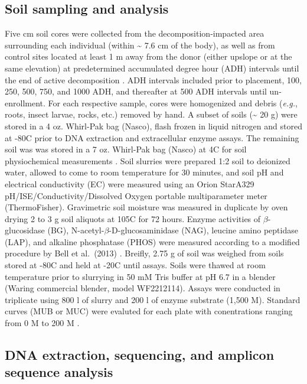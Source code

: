 \documentclass[
  10pt,
  letterpaper,
]{article}
\begin{document}
\subsection{Soil sampling and
analysis}\label{soil-sampling-and-analysis}

Five cm soil cores were collected from the decomposition-impacted area
surrounding each individual (within \textasciitilde{} 7.6 cm of the
body), as well as from control sites located at least 1 m away from the
donor (either upslope or at the same elevation) at predetermined
accumulated degree hour (ADH) intervals until the end of active
decomposition \citep{mason_body_2022}. ADH intervals included prior to
placement, 100, 250, 500, 750, and 1000 ADH, and thereafter at 500 ADH
intervals until un-enrollment. For each respective sample, cores were
homogenized and debris (\emph{e.g.}, roots, insect larvae, rocks, etc.)
removed by hand. A subset of soils (\textasciitilde{} 20 g) were stored
in a 4 oz. Whirl-Pak bag (Nasco), flash frozen in liquid nitrogen and
stored at -80\textdegree C prior to DNA extraction and extracellular
enzyme assays. The remaining soil was was stored in a 7 oz. Whirl-Pak
bag (Nasco) at 4\textdegree C for soil physiochemical measurements
\citep{mason_body_2022}. Soil slurries were prepared 1:2 soil to
deionized water, allowed to come to room temperature for 30 minutes, and
soil pH and electrical conductivity (EC) were measured using an Orion
Star\texttrademark  A329 pH/ISE/Conductivity/Dissolved Oxygen portable
multiparameter meter (ThermoFisher). Gravimetric soil moisture was
measured in duplicate by oven drying 2 to 3 g soil aliquots at
105\textdegree C for 72 hours. Enzyme activities of
\(\beta\)-glucosidase (BG), N-acetyl-\(\beta\)-D-glucosaminidase (NAG),
leucine amino peptidase (LAP), and alkaline phosphatase (PHOS) were
measured according to a modified procedure by Bell et al.~(2013)
\citep{mason_body_2022, bell_high-throughput_2013}. Breifly, 2.75 g of
soil was weighed from soils stored at -80\textdegree C and held at
-20\textdegree C until assays. Soils were thawed at room temperature
prior to slurrying in 50 mM Tris buffer at pH 6.7 in a blender (Waring
commercial blender, model WF2212114). Assays were conducted in
triplicate using 800 \textmu l of slurry and 200 \textmu l of enzyme
substrate (1,500 \textmu M). Standard curves (MUB or MUC) were evaluted
for each plate with conentrations ranging from 0 \textmu M to 200
\textmu M \citep{mason_body_2022}.

\subsection{DNA extraction, sequencing, and amplicon sequence
analysis}\label{dna-extraction-sequencing-and-amplicon-sequence-analysis}
\end{document}
